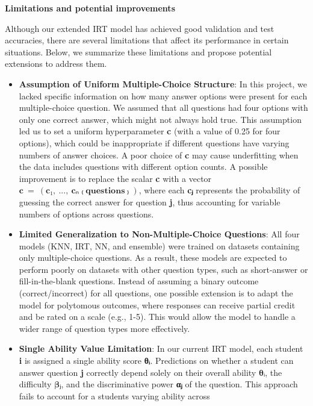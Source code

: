 \textbf{\hfill\break
Limitations and potential improvements}

Although our extended IRT model has achieved good validation and test
accuracies, there are several limitations that affect its performance in
certain situations. Below, we summarize these limitations and propose
potential extensions to address them.

\begin{itemize}
\item
  \textbf{Assumption of Uniform Multiple-Choice Structure}: In this
  project, we lacked specific information on how many answer options
  were present for each multiple-choice question. We assumed that all
  questions had four options with only one correct answer, which might
  not always hold true. This assumption led us to set a uniform
  hyperparameter \textbf{c} (with a value of 0.25 for four options),
  which could be inappropriate if different questions have varying
  numbers of answer choices. A poor choice of \textbf{c} may cause
  underfitting when the data includes questions with different option
  counts. A possible improvement is to replace the scalar \textbf{c}
  with a vector \(\mathbf{c\  = \ (c₁,\ ...,\ cₙ₍questions₎)}\), where
  each \textbf{cⱼ} represents the probability of guessing the correct
  answer for question \textbf{j}, thus accounting for variable numbers
  of options across questions.
\item
  \textbf{Limited Generalization to Non-Multiple-Choice Questions}: All
  four models (KNN, IRT, NN, and ensemble) were trained on datasets
  containing only multiple-choice questions. As a result, these models
  are expected to perform poorly on datasets with other question types,
  such as short-answer or fill-in-the-blank questions. Instead of
  assuming a binary outcome (correct/incorrect) for all questions, one
  possible extension is to adapt the model for polytomous outcomes,
  where responses can receive partial credit and be rated on a scale
  (e.g., 1-5). This would allow the model to handle a wider range of
  question types more effectively.
\item
  \textbf{Single Ability Value Limitation}: In our current IRT model,
  each student \textbf{i} is assigned a single ability score
  \textbf{θᵢ}. Predictions on whether a student can answer question
  \textbf{j} correctly depend solely on their overall ability
  \(\mathbf{\theta ᵢ}\), the difficulty \(\mathbf{\beta ⱼ}\), and the
  discriminative power \textbf{αⱼ} of the question. This approach fails
  to account for a student\textquotesingle s varying ability across

\end{itemize}
